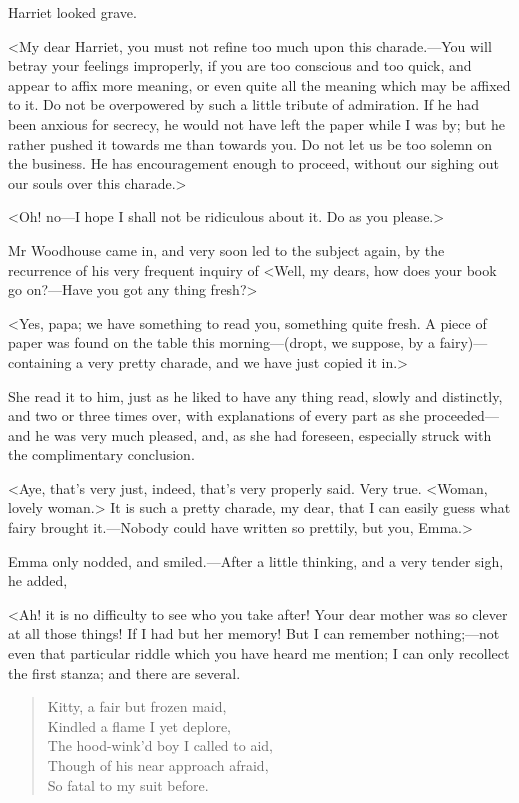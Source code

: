 Harriet looked grave.

<My dear Harriet, you must not refine too much upon this charade.—You will betray your feelings improperly, if you are too conscious and too quick, and appear to affix more meaning, or even quite all the meaning which may be affixed to it. Do not be overpowered by such a little tribute of admiration. If he had been anxious for secrecy, he would not have left the paper while I was by; but he rather pushed it towards me than towards you. Do not let us be too solemn on the business. He has encouragement enough to proceed, without our sighing out our souls over this charade.>

<Oh! no—I hope I shall not be ridiculous about it. Do as you please.>

Mr Woodhouse came in, and very soon led to the subject again, by the recurrence of his very frequent inquiry of <Well, my dears, how does your book go on?—Have you got any thing fresh?>

<Yes, papa; we have something to read you, something quite fresh. A piece of paper was found on the table this morning—(dropt, we suppose, by a fairy)—containing a very pretty charade, and we have just copied it in.>

She read it to him, just as he liked to have any thing read, slowly and distinctly, and two or three times over, with explanations of every part as she proceeded—and he was very much pleased, and, as she had foreseen, especially struck with the complimentary conclusion.

<Aye, that's very just, indeed, that's very properly said. Very true. <Woman, lovely woman.> It is such a pretty charade, my dear, that I can easily guess what fairy brought it.—Nobody could have written so prettily, but you, Emma.>

Emma only nodded, and smiled.—After a little thinking, and a very tender sigh, he added,

<Ah! it is no difficulty to see who you take after! Your dear mother was so clever at all those things! If I had but her memory! But I can remember nothing;—not even that particular riddle which you have heard me mention; I can only recollect the first stanza; and there are several.


\begin{samepage}
\begin{verse}
Kitty, a fair but frozen maid,\\
    Kindled a flame I yet deplore,\\
The hood-wink'd boy I called to aid,\\
Though of his near approach afraid,\\
    So fatal to my suit before.\\
	\end{verse}
\end{samepage}

